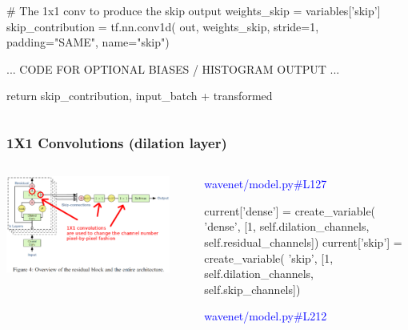 \documentclass[8pt]{beamer}
\begin{document}
\begin{frame}[fragile]
\begin{columns}
\begin{column}{0.5\textwidth}
\begin{verbnobox}[\tiny]
        # The 1x1 conv to produce the skip output
        weights_skip = variables['skip']
        skip_contribution = tf.nn.conv1d(
            out, weights_skip, stride=1, padding="SAME", name="skip")

        ... CODE FOR OPTIONAL BIASES / HISTOGRAM OUTPUT ...
        
        return skip_contribution, input_batch + transformed
 \end{verbnobox}

\end{column}
\end{columns} 
 
\end{frame}

\begin{frame}[fragile]
\frametitle{1X1 Convolutions (dilation layer)}
\begin{columns}
\begin{column}{0.5\textwidth}
 
\includegraphics[width=0.9\textwidth]{./dl3_images/1x1_convolutions.png}

\end{column}
\begin{column}{0.5\textwidth}
 
\textcolor{blue}{wavenet/model.py\#L127}
 
\begin{verbnobox}[\tiny]
    current['dense'] = create_variable(
        'dense',
        [1,
            self.dilation_channels,
            self.residual_channels])
    current['skip'] = create_variable(
        'skip',
        [1,
            self.dilation_channels,
            self.skip_channels])
\end{verbnobox}

\textcolor{blue}{wavenet/model.py\#L212}
 

\end{column}
\end{columns}
\end{frame}
\end{document}
